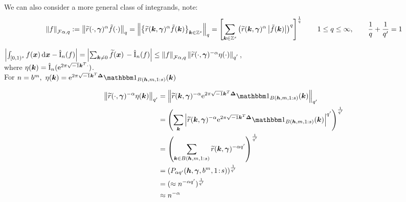 \documentclass{iitthesis-au} %
\newcommand{\tr}{\widetilde{r}}
\DeclareMathOperator{\appxint}{\hat{I}}
\newcommand{\onetos}{1\!:\!s}
\begin{document}





We can also consider a more general class of integrands, note: 
$$
\norm[\cf{\alpha,q}]{f} := \norm[q]{\tr(\cdot,\vgamma)^{\alpha}\tilde{f}(\cdot)} = \norm[q]{\big\{\tr(\vk,\vgamma)^{\alpha}\tilde{f}(\vk)\bigr\}_{\vk \in \integers^s}} = \left[\sum_{\vk \in \integers^s} \left(\tr(\vk,\vgamma)^{\alpha}\abs{\tilde{f}(\vk)}\right)^q \right]^{\frac{1}{q}} \qquad 1 \leq q \leq \infty, \qquad\frac{1}{q} + \frac{1}{q'} = 1 
$$

$\abs{\int_{[0,1)^{s}} f(\vx) \, \dif \vx - \appxint_n(f)} = \abs{\sum_{\vk \neq 0} \tf(\vx) \, - \appxint_n(f)}  \leq \norm[\cf{\alpha,q}]{f} \norm[q^{'}]{\tr(\cdot,\vgamma)^{-\alpha} \eta(\cdot)}$, \\ 

where $\eta(\vk) = \appxint_n(\me^{2 \pi \sqrt{-1} \vk^T \cdot})$. \\

For $n = b^m,\  \eta(\vk) = \me^{2 \pi \sqrt{-1} \vk^T \vDelta}\bbone_{B(\vh,m,1:s)}(\vk) $

\begin{align*}
    \norm[q'] {\tr(\cdot,\vgamma)^{-\alpha} \eta(\vk)} 
    &= \norm[q'] {\tr(\vk,\vgamma)^{-\alpha} \me^{2 \pi \sqrt{-1} \vk^T \vDelta}\bbone_{B(\vh,m,1:s)}(\vk) } \\
    &=  \left( \sum_{\vk} \abs{\tr(\vk,\vgamma)^{-\alpha} \me^{2 \pi \sqrt{-1} \vk^T \vDelta}\bbone_{B(\vh,m,1:s)}(\vk)}^{q'}\right)^{\frac{1}{q'}} \\
    &= \left(\sum_{\vk \in B(\vh,m,1:s)} \tr(\vk,\vgamma)^{-\alpha q'}\right)^{\frac{1}{q'}} \\
    &= \left( P_{\alpha q'}(\vh,\vgamma,b^m,\onetos) \right)^{\frac{1}{q'}} \\
    &= (\approx n^{-\alpha q'})^{\frac{1}{q'}} \\
    & \approx n^{-\alpha}
\end{align*}
\end{document}
